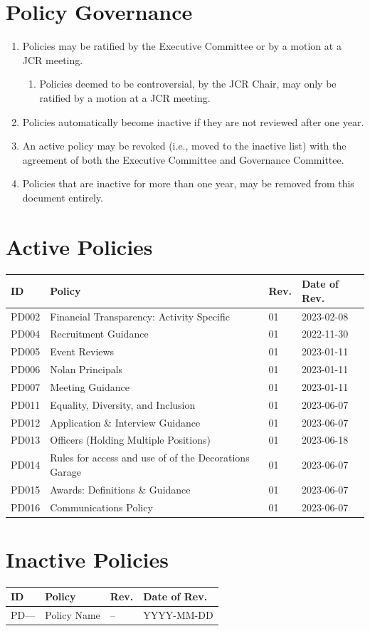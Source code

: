 \documentclass[12pt]{article}
\begin{document}
\section{Policy Governance}
\begin{enumerate}
    \item Policies may be ratified by the Executive Committee or by a motion at a JCR meeting.
    \begin{enumerate}
        \item Policies deemed to be controversial, by the JCR Chair, may only be ratified by a motion at a JCR meeting. 
    \end{enumerate}
    \item Policies automatically become inactive if they are not reviewed after one year.
    \item An active policy may be revoked (i.e., moved to the inactive list) with the agreement of both the Executive Committee and Governance Committee.
    \item Policies that are inactive for more than one year, may be removed from this document entirely.
\end{enumerate}

\section{Active Policies}
 \begin{longtable}{|l|l|l|l|}
        \hline
        \textbf{ID} & \textbf{Policy} & \textbf{Rev.} & \textbf{Date of Rev.}  \\
        \hline\hline
        \endhead
        \hline
        \endfoot
        PD002 & Financial Transparency: Activity Specific & 01 & 2023-02-08 \\
        PD004 & Recruitment Guidance & 01 & 2022-11-30 \\
        PD005 & Event Reviews & 01 & 2023-01-11 \\
        PD006 & Nolan Principals & 01 & 2023-01-11 \\
        PD007 & Meeting Guidance & 01 & 2023-01-11 \\
        PD011 & Equality, Diversity, and Inclusion & 01 & 2023-06-07 \\
        PD012 & Application \& Interview Guidance & 01 & 2023-06-07 \\
        PD013 & Officers (Holding Multiple Positions) &01& 2023-06-18 \\
        PD014 & Rules for access and use of of the Decorations Garage & 01& 2023-06-07 \\
        PD015 & Awards: Definitions \& Guidance & 01 & 2023-06-07 \\
        PD016 & Communications Policy & 01 & 2023-06-07 \\
    \end{longtable}
\clearpage
\section{Inactive Policies}
 \begin{longtable}{|l|l|l|l|}
        \hline
        \textbf{ID} & \textbf{Policy} & \textbf{Rev.} & \textbf{Date of Rev.}  \\
        \hline\hline
        \endhead
        \hline
        \endfoot
        PD--- & Policy Name & -- & YYYY-MM-DD \\
    \end{longtable}
\end{document}
